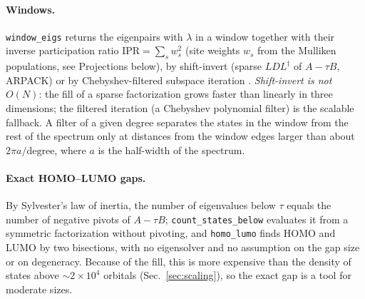 \documentclass[reprint,nofootinbib,superscriptaddress,amsmath,amssymb,aps,prb,floatfix]{revtex4-2}
\begin{document}
\paragraph*{Windows.}
\texttt{window\_eigs} returns the eigenpairs with $\lambda$ in a window together with their inverse participation ratio $\mathrm{IPR}=\sum_s w_s^2$ (site weights $w_s$ from the Mulliken populations, see Projections below), by shift-invert (sparse $LDL^\dagger$ of $A-\tau B$, ARPACK) or by Chebyshev-filtered subspace iteration \cite{zhou}.
\emph{Shift-invert is not $O(N)$}: the fill of a sparse factorization grows faster than linearly in three dimensions; the filtered iteration (a Chebyshev polynomial filter) is the scalable fallback. A filter of a given degree separates the states in the window from the rest of the spectrum only at distances from the window edges larger than about $2\pi a/\mathrm{degree}$, where $a$ is the half-width of the spectrum.
\paragraph*{Exact HOMO--LUMO gaps.}
By Sylvester's law of inertia, the number of eigenvalues below $\tau$ equals the number of negative pivots of $A-\tau B$; \texttt{count\_states\_below} evaluates it from a symmetric factorization without pivoting, and \texttt{homo\_lumo} finds HOMO and LUMO by two bisections, with no eigensolver and no assumption on the gap size or on degeneracy.
Because of the fill, this is more expensive than the density of states above $\sim2\times10^4$ orbitals (Sec.~\ref{sec:scaling}), so the exact gap is a tool for moderate sizes.
\end{document}
